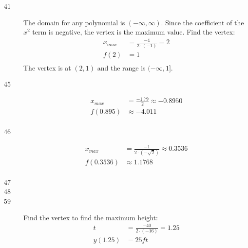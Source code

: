 \documentclass{exam}
\begin{document}
\begin{description}
    \item[41]
      The domain for any polynomial is $(-\infty, \infty)$.  Since the coefficient of the $x^2$ term is negative, the
      vertex is the maximum value.  Find the vertex:
      \begin{align*}
        x_{max} &= \frac{-4}{2 \cdot (-1)} = 2 \\
        f(2) &= 1 \\
      \end{align*}
      The vertex is at $(2, 1)$ and the range is $(-\infty, 1]$.

    \item[45]
      \begin{align*}
        x_{max}  &= \frac{-1.79}{2} \approx -0.8950 \\
        f(0.895) &\approx -4.011 \\
      \end{align*}

    \item[46]
      \begin{align*}
        x_{max}   &= \frac{-1}{2 \cdot (-\sqrt{2})} \approx 0.3536 \\
        f(0.3536) &\approx 1.1768 \\
      \end{align*}

    \item[47]

    \item[48]

    \item[59]
      Find the vertex to find the maximum height:
      \begin{align*}
        t &= \frac{-40}{2 \cdot (-16)} = 1.25 \\
        y(1.25) &= 25 \unit{ft} \\
      \end{align*}


\end{description}
\end{document}
